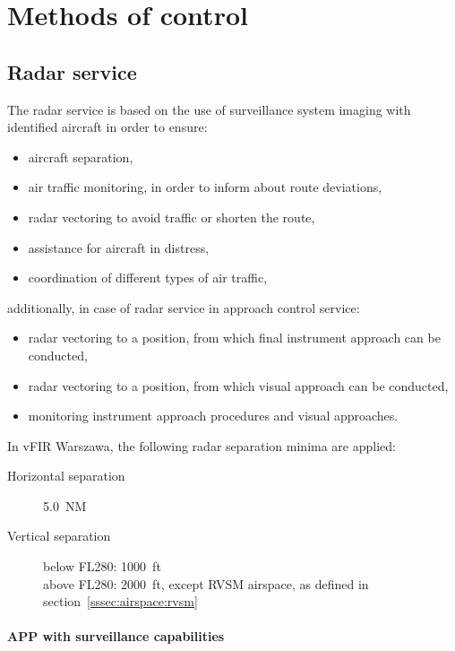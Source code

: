 \chapter{Methods of control}%
\label{ch:app:methods}

\section{Radar service}

The radar service is based on the use of surveillance system imaging with
identified aircraft in order to ensure:

\begin{itemize}
\item aircraft separation,
\item air traffic monitoring, in order to inform about route deviations,
\item radar vectoring to avoid traffic or shorten the route,
\item assistance for aircraft in distress,
\item coordination of different types of air traffic,
\end{itemize} additionally, in case of radar service in approach control
service:
\begin{itemize}
\item radar vectoring to a position, from which final instrument approach can be
conducted,
\item radar vectoring to a position, from which visual approach can be
conducted,
\item monitoring instrument approach procedures and visual approaches.
\end{itemize}

In vFIR Warszawa, the following radar separation minima are applied:

\begin{description}
\item[Horizontal separation] 5.0~NM
\item[Vertical separation]\parbox[t]{0.8\textwidth}{ below FL280: 1000~ft\\
above FL280: 2000~ft, except RVSM airspace, as defined in section~\ref{sssec:airspace:rvsm}}
\end{description}

\subsubsection{APP with surveillance capabilities}

